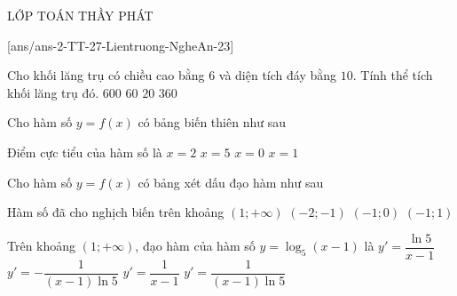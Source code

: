 \begin{name}
	{\tenchude}{\tendethi}{LỚP TOÁN THẦY PHÁT}{\thoigian}
\end{name}
\setcounter{ex}{0}\setcounter{bt}{0}
[ans/ans-2-TT-27-Lientruong-NgheAn-23]
\begin{ex}%
	Cho khối lăng trụ có chiều cao bằng $6$ và diện tích đáy bằng $10$. Tính thể tích khối lăng trụ đó.	
	\choice
	{$600$}
	{\True $60$}
	{$20$}
	{$360$}
\end{ex}
\begin{ex}%
	Cho hàm số $y=f(x)$ có bảng biến thiên như sau
	\begin{center}
	\end{center}	
	Điểm cực tiểu của hàm số là
	\choice
	{$x=2$}
	{$x=5$}
	{\True $x=0$}
	{ $x=1$}
\end{ex}
\begin{ex}%
	Cho hàm số $y=f(x)$ có bảng xét dấu đạo hàm như sau
	\begin{center}
	\end{center}	
	Hàm số đã cho nghịch biến trên khoảng
	\choice
	{$(1;+\infty)$}
	{\True $(-2;-1)$}
	{$(-1;0)$}
	{$(-1;1)$}
\end{ex}
\begin{ex}%
	Trên khoảng $(1 ;+\infty)$, đạo hàm của hàm số $y=\log _5(x-1)$ là	
	\choice
	{$y'=\dfrac{\ln 5}{x-1}$}
	{$y'=-\dfrac{1}{(x-1) \ln 5}$}
	{$y'=\dfrac{1}{x-1}$}
	{\True $y'=\dfrac{1}{(x-1) \ln 5}$}
\end{ex}
